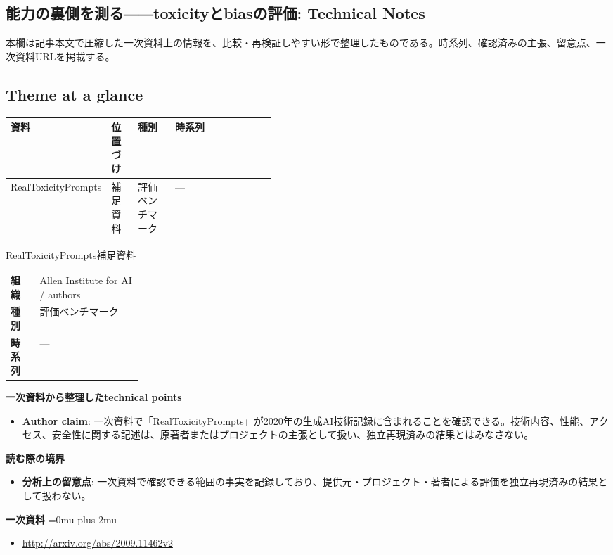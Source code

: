 \subsection*{能力の裏側を測る――toxicityとbiasの評価: Technical Notes}
本欄は記事本文で圧縮した一次資料上の情報を、比較・再検証しやすい形で整理したものである。時系列、確認済みの主張、留意点、一次資料URLを掲載する。
\medskip
\subsection*{Theme at a glance}
\begin{center}
\footnotesize
\begin{tabularx}{\linewidth}{@{}p{0.20\linewidth}p{0.10\linewidth}p{0.14\linewidth}X@{}}
\toprule
資料 & 位置づけ & 種別 & 時系列 \\
\midrule
RealToxicityPrompts & 補足資料 & 評価ベンチマーク & — \\
\bottomrule
\end{tabularx}
\end{center}
\normalsize

\begin{technicalnote}{RealToxicityPrompts}{補足資料}
\begingroup
\begin{tabularx}{\linewidth}{@{}>{\bfseries}p{0.22\linewidth}X@{}}
組織 & Allen Institute for AI / authors \\
種別 & 評価ベンチマーク \\
時系列 & — \\
\end{tabularx}
\smallskip
{\bfseries 一次資料から整理したtechnical points}
\begin{itemize}[leftmargin=1.5em,itemsep=0.35em]
\item \textbf{Author claim}: 一次資料で「RealToxicityPrompts」が2020年の生成AI技術記録に含まれることを確認できる。技術内容、性能、アクセス、安全性に関する記述は、原著者またはプロジェクトの主張として扱い、独立再現済みの結果とはみなさない。
\end{itemize}
\begin{minipage}{\linewidth}
{\bfseries 読む際の境界}
\begin{itemize}[leftmargin=1.5em,itemsep=0.35em]
\item \textbf{分析上の留意点}: 一次資料で確認できる範囲の事実を記録しており、提供元・プロジェクト・著者による評価を独立再現済みの結果として扱わない。
\end{itemize}
\begin{samepage}
{\bfseries 一次資料}
\begingroup\sloppy
\Urlmuskip=0mu plus 2mu\relax
\begin{itemize}[leftmargin=1.5em,itemsep=0.25em]
\item {\scriptsize\url{http://arxiv.org/abs/2009.11462v2}}
\end{itemize}
\endgroup
\end{samepage}
\end{minipage}
\endgroup
\end{technicalnote}
\medskip
